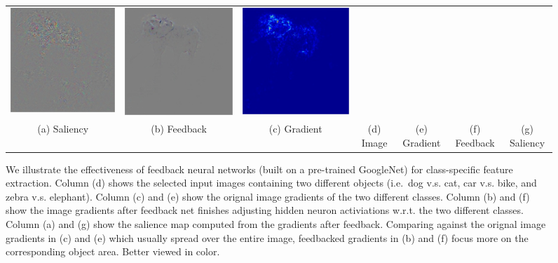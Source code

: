 \begin{figure}
\begin{center}
\begin{tabular}{ccccccc}
\includegraphics[width=0.13\linewidth]{figs/examples/googlenet/oxford/zeb-ele2_diff_387} &
\includegraphics[width=0.13\linewidth]{figs/examples/googlenet/soft/zeb-ele2_diff_387} &
\includegraphics[width=0.13\linewidth]{figs/examples/googlenet/soft/zeb-ele2_sali_387} \\
{\small (a) Saliency} &
{\small (b) Feedback} &
{\small (c) Gradient} &
{\small (d) Image} &
{\small (e) Gradient} &
{\small (f) Feedback} &
{\small (g) Saliency}
\end{tabular}
\caption{We illustrate the effectiveness of feedback neural networks (built on a pre-trained GoogleNet) for class-specific feature extraction. Column (d) shows the selected input images containing two different objects (i.e.\ dog v.s. cat, car v.s. bike, and zebra v.s. elephant). Column (c) and (e) show the orignal image gradients of the two different classes. Column (b) and (f) show the image gradients after feedback net finishes adjusting hidden neuron activiations w.r.t. the two different classes. Column (a) and (g) show the salience map computed from the gradients after feedback. Comparing against the orignal image gradients in (c) and (e) which usually spread over the entire image, feedbacked gradients in (b) and (f) focus more on the corresponding object area. Better viewed in color.}
\label{fig:examples}
\end{center}
\end{figure}


